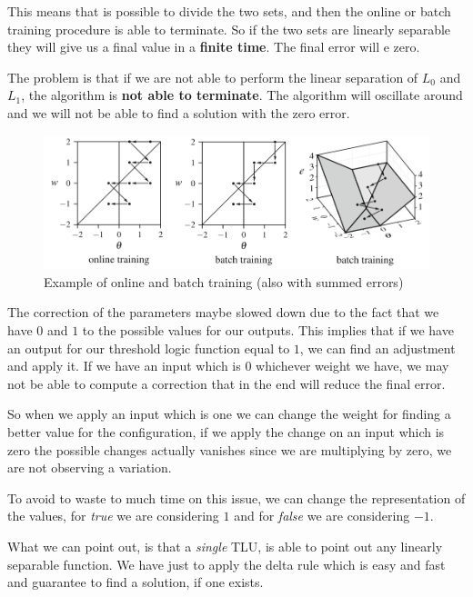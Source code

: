 \documentclass{article}
\begin{document}
This means that is possible to divide the two sets, and then the online or batch
training procedure is able to terminate. So if the two sets are linearly separable they
will give us a final value in a \textbf{finite time}. The final error will e zero.

The problem is that if we are not able to perform the linear separation of $L_0$ and $L_1$,
the algorithm is \textbf{not able to terminate}. The algorithm will oscillate around and we
will not be able to find a solution with the zero error.

\begin{figure}[H]
    \centering
    \includegraphics[scale=0.4]{images/batch_training_example_graph.png}
    \caption{Example of online and batch training (also with summed errors)}
\end{figure}

The correction of the parameters maybe slowed down due to the fact that we have $0$ and $1$
to the possible values for our outputs. This implies that if we have an output for our
threshold logic function equal to $1$, we can find an adjustment and apply it.
If we have an input which is $0$ whichever weight we have, we may not be able to compute
a correction that in the end will reduce the final error.

So when we apply an input which is one we can change the weight for finding a better value
for the configuration, if we apply the change on an input which is zero the possible changes
actually vanishes since we are multiplying by zero, we are not observing a variation.

To avoid to waste to much time on this issue, we can change the representation of the values,
for \textit{true} we are considering $1$ and for \textit{false} we are considering $-1$.

What we can point out, is that a \textit{single} TLU, is able to point out any linearly
separable function. We have just to apply the delta rule which is easy and fast and
guarantee to find a solution, if one exists.
\end{document}
